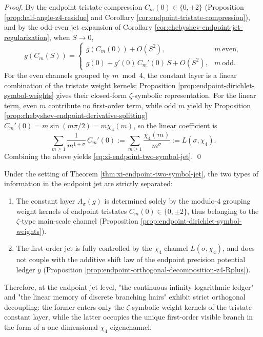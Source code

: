 \begin{proof}
By the endpoint tristate compression \(C_m(0)\in\{0,\pm 2\}\) (Proposition \ref{prop:half-angle-z4-residue} and Corollary \ref{cor:endpoint-tristate-compression}), and by the odd-even jet expansion of Corollary \ref{cor:chebyshev-endpoint-jet-regularization},
when \(S\to 0\),
\[
g(C_m(S))=
\begin{cases}
g(C_m(0))+O(S^2), & m\ \text{even},\\
g(0)+g'(0)\,C_m'(0)\,S+O(S^2), & m\ \text{odd}.
\end{cases}
\]
For the even channels grouped by \(m\bmod 4\), the constant layer is a linear combination of the tristate weight kernels; Proposition \ref{prop:endpoint-dirichlet-symbol-weights} gives their closed-form \(\zeta\)-symbolic representation.
For the linear term, even \(m\) contribute no first-order term, while odd \(m\) yield by Proposition \ref{prop:chebyshev-endpoint-derivative-splitting}
\(
C_m'(0)=m\sin(m\pi/2)=m\chi_4(m)
\),
so the linear coefficient is
\[
\sum_{m\ge 1}\frac{1}{m^{1+\sigma}}\,C_m'(0)
:=\sum_{m\ge 1}\frac{\chi_4(m)}{m^\sigma}
:=L(\sigma,\chi_4).
\]
Combining the above yields \eqref{eq:xi-endpoint-two-symbol-jet}. \qed
\end{proof}

\begin{corollary}\label{cor:xi-endpoint-jet-orthogonal-decoupling}
Under the setting of Theorem \ref{thm:xi-endpoint-two-symbol-jet}, the two types of information in the endpoint jet are strictly separated:
\begin{enumerate}
  \item The constant layer \(A_\sigma(g)\) is determined solely by the modulo-\(4\) grouping weight kernels of endpoint tristates \(C_m(0)\in\{0,\pm 2\}\), thus belonging to the \(\zeta\)-type main-scale channel (Proposition \ref{prop:endpoint-dirichlet-symbol-weights}).
  \item The first-order jet is fully controlled by the \(\chi_4\) channel \(L(\sigma,\chi_4)\), and does not couple with the additive shift law of the endpoint precision potential ledger \(y\) (Proposition \ref{prop:endpoint-orthogonal-decomposition-z4-Rplus}).
\end{enumerate}
Therefore, at the endpoint jet level, "the continuous infinity logarithmic ledger" and "the linear memory of discrete branching hairs" exhibit strict orthogonal decoupling: the former enters only the \(\zeta\)-symbolic weight kernels of the tristate constant layer, while the latter occupies the unique first-order visible branch in the form of a one-dimensional \(\chi_4\) eigenchannel.
\end{corollary}

